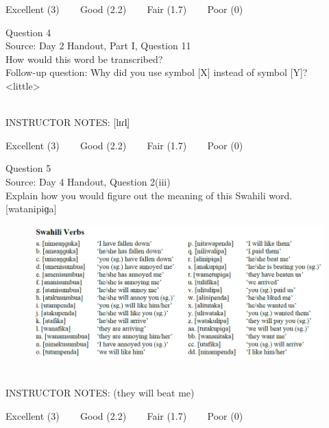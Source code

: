 \documentclass[12pt]{article}
\begin{document}
\vfill
Excellent (3) ~~~ Good (2.2) ~~~ Fair (1.7) ~~~ Poor (0)
\newpage

{\large Question 4}\\

Source: Day 2 Handout, Part I, Question 11\\

How would this word be transcribed?\\ Follow-up question: Why did you use symbol [X] instead of symbol [Y]?\\

<little>


~\\
INSTRUCTOR NOTES: [lɪɾl̩]


\vfill
Excellent (3) ~~~ Good (2.2) ~~~ Fair (1.7) ~~~ Poor (0)
\newpage

{\large Question 5}\\

Source: Day 4 Handout, Question 2(iii)\\

Explain how you would figure out the meaning of this Swahili word.\\

{[watanipiɡa]}

\begin{figure}[H]
\includegraphics{../images/swahiliverbs.png}
\end{figure}

~\\
INSTRUCTOR NOTES: (they will beat me)


\vfill
Excellent (3) ~~~ Good (2.2) ~~~ Fair (1.7) ~~~ Poor (0)
\newpage

\begin{center}
\textbf{{\color{red}{\HUGE END OF EXAM}}}\\

\end{center}
\newpage
\end{document}
